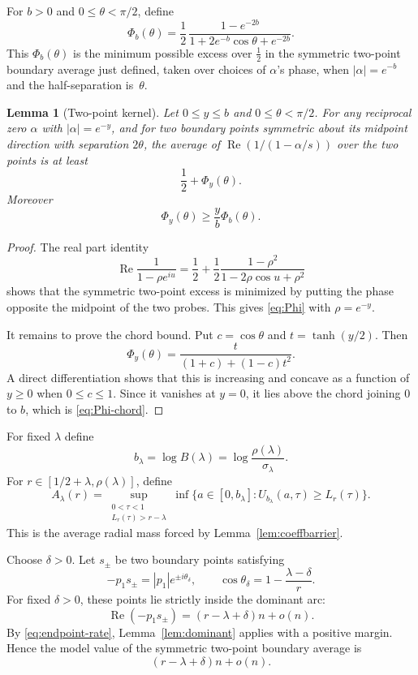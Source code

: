 \documentclass[11pt]{article}
\newtheorem{lemma}[theorem]{Lemma}
\DeclareMathOperator{\Repart}{Re}
\begin{document}
\medskip
For $b>0$ and $0\leq\theta<\pi/2$, define
\[
        \Phi_b(\theta)=\frac12\,
        \frac{1-e^{-2b}}{1+2e^{-b}\cos\theta+e^{-2b}}.
        \tag{5.1}\label{eq:Phi}
\]
This $\Phi_b(\theta)$ is the minimum possible excess over $\tfrac12$ in the
symmetric two-point boundary average just defined, taken over choices of
$\alpha$'s phase, when $|\alpha|=e^{-b}$ and the half-separation is~$\theta$.

\begin{lemma}[Two-point kernel]\label{lem:twopoint-kernel}
Let $0\leq y\leq b$ and $0\leq\theta<\pi/2$.  For any reciprocal zero
$\alpha$ with $|\alpha|=e^{-y}$, and for two boundary points symmetric about
its midpoint direction with separation $2\theta$, the average of
$\Repart(1/(1-\alpha/s))$ over the two points is at least
\[
        \frac12+\Phi_y(\theta).
\]
Moreover
\[
        \Phi_y(\theta)\geq \frac yb\Phi_b(\theta).
        \tag{5.2}\label{eq:Phi-chord}
\]
\end{lemma}

\begin{proof}
The real part identity
\[
        \Repart\frac1{1-\rho e^{iu}}
        =\frac12+\frac12\frac{1-\rho^2}{1-2\rho\cos u+\rho^2}
\]
shows that the symmetric two-point excess is minimized by putting the phase
opposite the midpoint of the two probes.  This gives \eqref{eq:Phi} with
$\rho=e^{-y}$.

It remains to prove the chord bound.  Put $c=\cos\theta$ and
$t=\tanh(y/2)$.  Then
\[
        \Phi_y(\theta)=\frac{t}{(1+c)+(1-c)t^2}.
\]
A direct differentiation shows that this is increasing and concave as a
function of $y\geq0$ when $0\leq c\leq1$.  Since it vanishes at $y=0$, it
lies above the chord joining $0$ to $b$, which is \eqref{eq:Phi-chord}.
\end{proof}

For fixed $\lambda$ define
\[
        b_\lambda=\log B(\lambda)
        =\log\frac{\rho(\lambda)}{\sigma_\lambda}.
\]
For $r\in[1/2+\lambda,\rho(\lambda)]$, define
\[
        A_\lambda(r)=
        \sup_{\substack{0<\tau<1\\ L_r(\tau)>r-\lambda}}
        \inf\{a\in[0,b_\lambda]:U_{b_\lambda}(a,\tau)\geq L_r(\tau)\}.
        \tag{5.3}\label{eq:A-lambda}
\]
This is the average radial mass forced by Lemma~\ref{lem:coeffbarrier}.

Choose \(\delta>0\). Let \(s_\pm\) be two boundary points satisfying
\[
        -p_1s_\pm=|p_1|e^{\pm i\theta_\delta},
        \qquad
        \cos\theta_\delta=1-\frac{\lambda-\delta}{r}.
        \tag{5.4}\label{eq:theta-delta}
\]
For fixed \(\delta>0\), these points lie strictly inside the dominant arc:
\[
        \Repart(-p_1s_\pm)=(r-\lambda+\delta)n+o(n).
\]
By \eqref{eq:endpoint-rate}, Lemma~\ref{lem:dominant} applies with a positive
margin. Hence the model value of the symmetric two-point boundary average is
\[
        (r-\lambda+\delta)n+o(n).
\]
\end{document}
